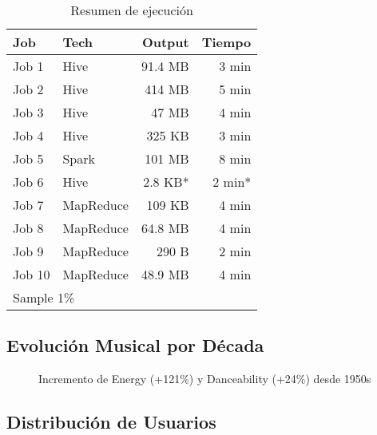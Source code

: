 \documentclass[11pt,a4paper]{article}
\begin{document}
\begin{table}[h]
\centering
\caption{Resumen de ejecución}
\small
\begin{tabular}{@{}llrr@{}}
\toprule
\textbf{Job} & \textbf{Tech} & \textbf{Output} & \textbf{Tiempo} \\ \midrule
Job 1 & Hive & 91.4 MB & 3 min \\
Job 2 & Hive & 414 MB & 5 min \\
Job 3 & Hive & 47 MB & 4 min \\
Job 4 & Hive & 325 KB & 3 min \\
Job 5 & Spark & 101 MB & 8 min \\
Job 6 & Hive & 2.8 KB* & 2 min* \\
Job 7 & MapReduce & 109 KB & 4 min \\
Job 8 & MapReduce & 64.8 MB & 4 min \\
Job 9 & MapReduce & 290 B & 2 min \\
Job 10 & MapReduce & 48.9 MB & 4 min \\ \bottomrule
\multicolumn{4}{l}{\footnotesize * Sample 1\%}
\end{tabular}
\end{table}

\subsection{Evolución Musical por Década}

\begin{figure}[h]
\centering
{}
\caption{Incremento de Energy (+121\%) y Danceability (+24\%) desde 1950s}
\end{figure}

\subsection{Distribución de Usuarios}
\end{document}
